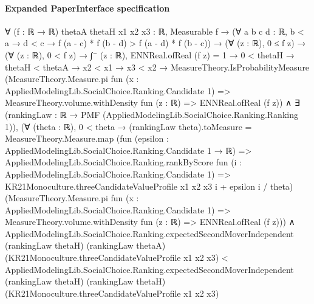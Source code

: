 \documentclass[10pt]{article}
\begin{document}
\paragraph{Expanded PaperInterface specification}
\begin{ReviewVerbatim}
∀ (f : ℝ → ℝ) {thetaA thetaH x1 x2 x3 : ℝ},
  Measurable f →
    (∀ {{a b c d : ℝ}}, b < a → d < c → f (a - c) * f (b - d) > f (a - d) * f (b - c)) →
      (∀ (z : ℝ), 0 ≤ f z) →
        (∀ (z : ℝ), 0 < f z) →
          ∫⁻ (z : ℝ), ENNReal.ofReal (f z) = 1 →
            0 < thetaH →
              thetaH < thetaA →
                x2 < x1 →
                  x3 < x2 →
                    MeasureTheory.IsProbabilityMeasure
                        (MeasureTheory.Measure.pi fun (x : AppliedModelingLib.SocialChoice.Ranking.Candidate 1) =>
                          MeasureTheory.volume.withDensity fun (z : ℝ) => ENNReal.ofReal (f z)) ∧
                      ∃ (rankingLaw : ℝ → PMF (AppliedModelingLib.SocialChoice.Ranking.Ranking 1)),
                        (∀ (theta : ℝ),
                            0 < theta →
                              (rankingLaw theta).toMeasure =
                                MeasureTheory.Measure.map
                                  (fun (epsilon : AppliedModelingLib.SocialChoice.Ranking.Candidate 1 → ℝ) =>
                                    AppliedModelingLib.SocialChoice.Ranking.rankByScore
                                      fun (i : AppliedModelingLib.SocialChoice.Ranking.Candidate 1) =>
                                      KR21Monoculture.threeCandidateValueProfile x1 x2 x3 i + epsilon i / theta)
                                  (MeasureTheory.Measure.pi
                                    fun (x : AppliedModelingLib.SocialChoice.Ranking.Candidate 1) =>
                                    MeasureTheory.volume.withDensity fun (z : ℝ) => ENNReal.ofReal (f z))) ∧
                          AppliedModelingLib.SocialChoice.Ranking.expectedSecondMoverIndependent (rankingLaw thetaH)
                              (rankingLaw thetaA) (KR21Monoculture.threeCandidateValueProfile x1 x2 x3) <
                            AppliedModelingLib.SocialChoice.Ranking.expectedSecondMoverIndependent (rankingLaw thetaH)
                              (rankingLaw thetaH) (KR21Monoculture.threeCandidateValueProfile x1 x2 x3)
\end{ReviewVerbatim}
\end{document}
